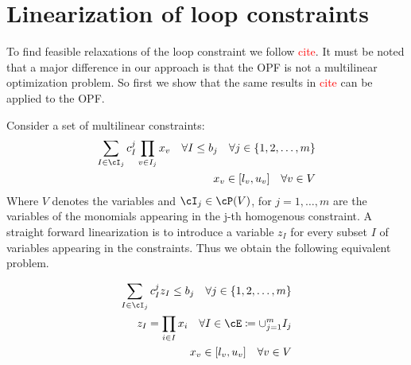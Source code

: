 \documentclass{article}
\begin{document}
	\section{Linearization of loop constraints}
	
	To find feasible relaxations of the loop constraint we follow \textcolor{red}{cite}. It must be noted that a major difference in our approach is that the OPF is not a multilinear optimization problem. So first we show that the same results in \textcolor{red}{cite} can be applied to the OPF.
	
	Consider a set of multilinear constraints:
	\begin{align}
		\sum_{I \in \cI_j}c_I^j\prod_{v \in I_j} x_v \quad \forall I \leq b_j \quad \forall j \in \{1,2,\ldots, m\} \\
		x_v \in [l_v,u_v] \quad \forall v \in V
	\end{align}
	Where \(V\) denotes the variables and \(\cI_j \in \cP(V)\), for \(j = 1,\ldots,m\) are the variables of the monomials appearing in the j-th homogenous constraint.
	A straight forward linearization is to introduce a variable \(z_I\) for every subset \(I\) of variables appearing in the constraints. Thus we obtain the following equivalent problem.
	
	\begin{align}
		\sum_{I \in \cI_j}c_I^jz_I \leq b_j \quad \forall j \in \{1,2,\ldots, m\} \label{constr: linearized multilinear constraint} \\
		z_I = \prod_{i \in I} x_i \quad \forall I \in \cE \coloneqq \cup_{j=1}^m I_j \\
		x_v \in [l_v,u_v] \quad \forall v \in V
	\end{align}
	
\end{document}

